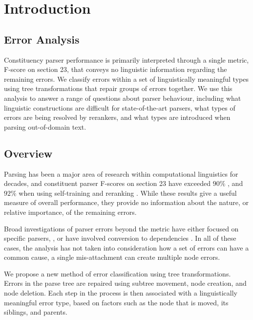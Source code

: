 \chapter{Introduction}


\section{Error Analysis}

Constituency parser performance is primarily interpreted through a single
metric, F-score on \wsj section 23, that conveys no linguistic information
regarding the remaining errors.  We classify errors within a set of
linguistically meaningful types using tree transformations that repair groups
of errors together.  We use this analysis to answer a range of questions about
parser behaviour, including what linguistic constructions are difficult for
state-of-the-art parsers, what types of errors are being resolved by rerankers,
and what types are introduced when parsing out-of-domain text.

\section{Overview}

Parsing has been a major area of research within computational linguistics for
decades, and constituent parser F-scores on \wsj section 23 have exceeded
$90\%$ \parencite{Petrov-Klein:2007}, and $92\%$ when using self-training and
reranking \parencite{McClosky-Charniak-Johnson:2006,Charniak-Johnson:2005}. 
While
these results give a useful measure of overall performance, they provide no
information about the nature, or relative importance, of the remaining errors.

Broad investigations of parser errors beyond the \parseval metric
\parencite{Black-etal:1991} have either focused on specific parsers, \eg
\parencite{Collins:2003}, or have involved conversion to dependencies
\parencite{Carroll-etal:1998,King:2003}.  In all of these cases, the analysis has
not taken into consideration how a set of errors can have a common cause, \eg a
single mis-attachment can create multiple node errors.

We propose a new method of error classification using tree transformations.
Errors in the parse tree are repaired using subtree movement, node
creation, and node deletion.  Each step in the process is then associated with
a linguistically meaningful error type, based on factors such as the node that is
moved, its siblings, and parents.  


